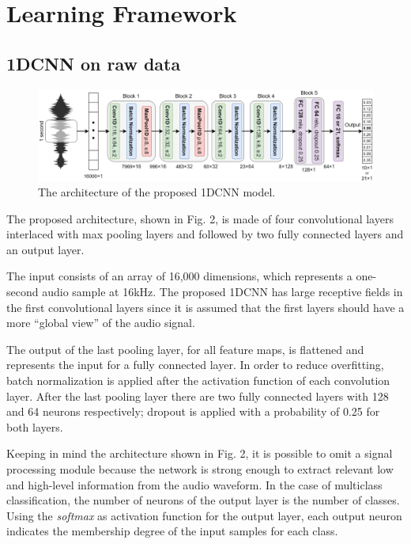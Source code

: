 \documentclass[conference]{IEEEtran}
\begin{document}
\section{Learning Framework}

\vspace{-1mm}
\subsection{1DCNN on raw data}
\begin{figure}
\centering
\includegraphics[scale=0.16]{1DCNN}
\caption{The architecture of the proposed 1DCNN model.}
\end{figure}

The proposed architecture, shown in Fig. 2, is made of four convolutional layers interlaced with max pooling layers and followed by two fully connected layers and an output layer.

The input consists of an array of 16,000 dimensions, which represents a one-second audio sample at 16kHz.
The proposed 1DCNN has large receptive fields in the first convolutional layers since it is assumed that the first layers should have a more “global view” of the audio signal. 

The output of the last pooling layer, for all feature maps, is flattened and represents the input for a fully connected layer. In order to reduce overfitting, batch normalization is applied after the activation function of each convolution layer. After the last pooling layer there are two fully connected layers with 128 and 64 neurons respectively; dropout is applied with a probability of 0.25 for both layers.

Keeping in mind the architecture shown in Fig. 2, it is possible to omit a signal processing module because the network is strong enough to extract relevant low and high-level information from the audio waveform.
In the case of multiclass classification, the number of neurons of the output layer is the number of classes. Using the \textit{softmax} as activation function for the output layer, each output neuron indicates the membership degree of the input samples for each class.
\end{document}
